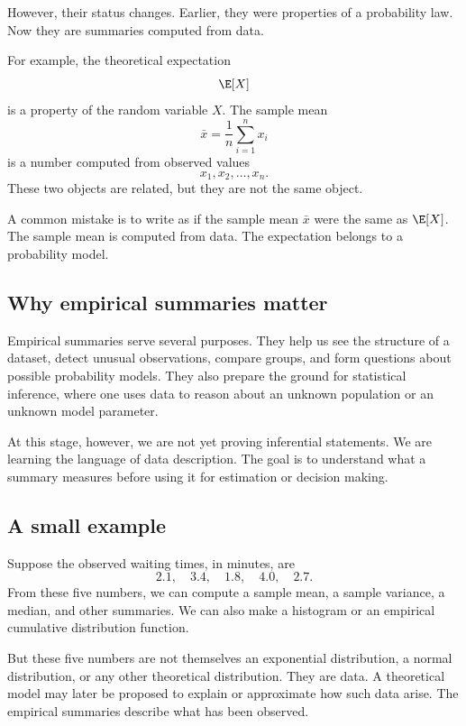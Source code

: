 However, their status changes. Earlier, they were properties of a probability
law. Now they are summaries computed from data.

For example, the theoretical expectation
\[
\E[X]
\]
is a property of the random variable \(X\). The sample mean
\[
\bar{x}=\frac1n\sum_{i=1}^n x_i
\]
is a number computed from observed values
\[
x_1,x_2,\ldots,x_n.
\]
These two objects are related, but they are not the same object.

\begin{remarkbox}
A common mistake is to write as if the sample mean \(\bar{x}\) were the same as
\(\E[X]\). The sample mean is computed from data. The expectation belongs to a
probability model.
\end{remarkbox}

\subsection*{Why empirical summaries matter}

Empirical summaries serve several purposes. They help us see the structure of a
dataset, detect unusual observations, compare groups, and form questions about
possible probability models. They also prepare the ground for statistical
inference, where one uses data to reason about an unknown population or an
unknown model parameter.

At this stage, however, we are not yet proving inferential statements. We are
learning the language of data description. The goal is to understand what a
summary measures before using it for estimation or decision making.

\subsection*{A small example}

Suppose the observed waiting times, in minutes, are
\[
2.1,\quad 3.4,\quad 1.8,\quad 4.0,\quad 2.7.
\]
From these five numbers, we can compute a sample mean, a sample variance, a
median, and other summaries. We can also make a histogram or an empirical
cumulative distribution function.

But these five numbers are not themselves an exponential distribution, a normal
distribution, or any other theoretical distribution. They are data. A theoretical
model may later be proposed to explain or approximate how such data arise. The
empirical summaries describe what has been observed.

